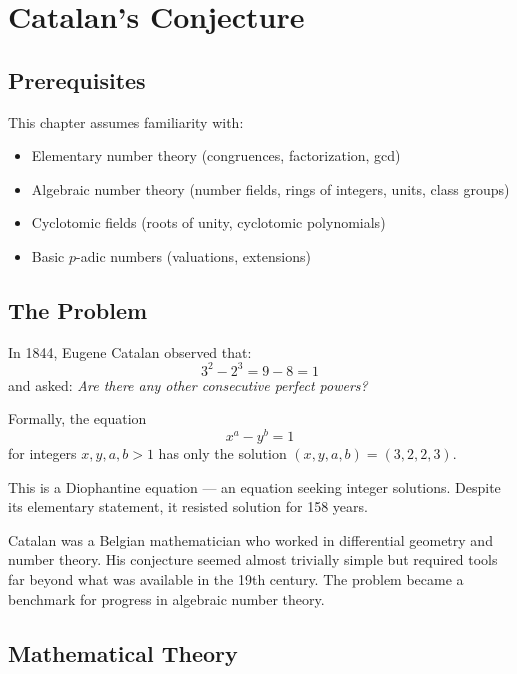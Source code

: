 \let\LocalMacro\relax

\chapter{Catalan's Conjecture}

\section{Prerequisites}
This chapter assumes familiarity with:
\begin{itemize}
\item Elementary number theory (congruences, factorization, gcd)
\item Algebraic number theory (number fields, rings of integers, units, class groups)
\item Cyclotomic fields (roots of unity, cyclotomic polynomials)
\item Basic $p$-adic numbers (valuations, extensions)
\end{itemize}

\section{The Problem}
In 1844, Eugene Catalan observed that:
\begin{equation}
3^2 - 2^3 = 9 - 8 = 1
\end{equation}
and asked: \emph{Are there any other consecutive perfect powers?}

Formally, the equation
\begin{equation}
x^a - y^b = 1
\end{equation}
for integers $x, y, a, b > 1$ has only the solution $(x, y, a, b) = (3, 2, 2, 3)$.

This is a Diophantine equation — an equation seeking integer solutions. Despite its elementary statement, it resisted solution for 158 years.

\begin{historicalbox}
Catalan was a Belgian mathematician who worked in differential geometry and number theory. His conjecture seemed almost trivially simple but required tools far beyond what was available in the 19th century. The problem became a benchmark for progress in algebraic number theory.
\end{historicalbox}

\section{Mathematical Theory}

